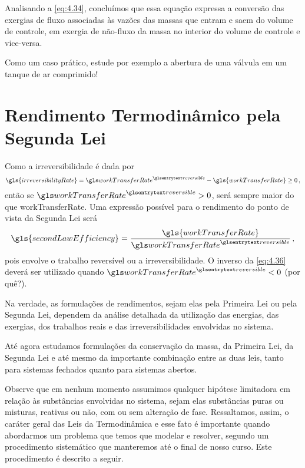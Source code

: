     Analisando a \cref{eq:4.34}, concluímos que essa equação expressa a
    conversão das exergias de fluxo associadas às vazões das massas que entram
    e saem do volume de controle, em exergia de não-fluxo da massa no interior
    do volume de controle e vice-versa.

    Como um caso prático, estude por exemplo a abertura de uma válvula em um
    tanque de ar comprimido!


    \section{Rendimento Termodinâmico pela Segunda Lei}

    Como a irreversibilidade é dada por
    \begin{equation} \label{eq:4.35}
        \gls{irreversibilityRate}
        =
        \gsuper{workTransferRate}{reversible}
        -
        \gls{workTransferRate}
        \ge 0\,,
    \end{equation}
    então se $\gsuper{workTransferRate}{reversible} > 0$,
     será sempre maior do que
    \gls{workTransferRate}. Uma expressão possível para o rendimento do ponto
    de vista da Segunda Lei será
    \begin{equation} \label{eq:4.36}
        \gls{secondLawEfficiency}
        =
        \frac{
            \gls{workTransferRate}
        }{
            \gsuper{workTransferRate}{reversible}
        }\,,
    \end{equation}
    pois envolve o trabalho reversível ou a irreversibilidade. O inverso da
    \cref{eq:4.36} deverá ser utilizado quando
    $\gsuper{workTransferRate}{reversible} < 0$  (por quê?).

    Na verdade, as formulações de rendimentos, sejam elas pela Primeira Lei ou
    pela Segunda Lei, dependem da análise detalhada da utilização das energias,
    das exergias, dos trabalhos reais e das irreversibilidades envolvidas no
    sistema.

    Até agora estudamos formulações da conservação da massa, da Primeira Lei,
    da Segunda Lei e até mesmo da importante combinação entre as duas leis,
    tanto para sistemas fechados quanto para sistemas abertos.

    Observe que em nenhum momento assumimos qualquer hipótese limitadora em
    relação às substâncias envolvidas no sistema, sejam elas substâncias puras
    ou misturas, reativas ou não, com ou sem alteração de fase. Ressaltamos,
    assim, o caráter geral das Leis da Termodinâmica e esse fato é importante
    quando abordarmos um problema que temos que modelar e resolver, segundo um
    procedimento sistemático que manteremos até o final de nosso curso. Este
    procedimento é descrito a seguir.


